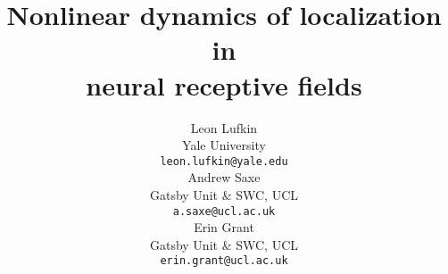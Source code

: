 \documentclass{article}
\title{
  Nonlinear dynamics of localization in \\ neural receptive fields
}
\author{
	Leon Lufkin \\
	Yale University \\
	\texttt{leon.lufkin@yale.edu} \\
    	\And
	Andrew Saxe \\
	Gatsby Unit \& SWC, UCL \\
	\texttt{a.saxe@ucl.ac.uk} \\
	\And
	Erin Grant \\
	Gatsby Unit \& SWC, UCL \\
	\texttt{erin.grant@ucl.ac.uk} 
}
\begin{document}
\maketitle

\begin{abstract}
  
\end{abstract}








\clearpage


\printbibliography

\clearpage
\appendix


\end{document}
